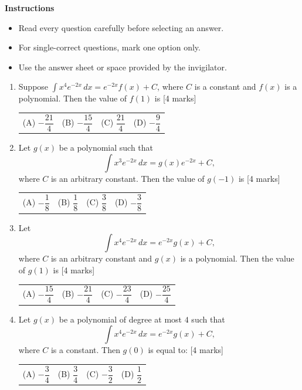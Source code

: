 \documentclass[11pt,a4paper]{article}
\begin{document}
\textbf{Instructions}
\begin{itemize}[topsep=2pt]
\item Read every question carefully before selecting an answer.
\item For single-correct questions, mark one option only.
\item Use the answer sheet or space provided by the invigilator.
\end{itemize}
\begin{enumerate}[resume]
\item Suppose \(\displaystyle \int x^{4}e^{-2x}\,dx=e^{-2x}f(x)+C\), where \(C\) is a constant and \(f(x)\) is a polynomial. Then the value of \(f(1)\) is \hfill [4 marks]
{\renewcommand{\arraystretch}{1.8}
\begin{tabularx}{\linewidth}{X X X X}
(A) \quad \(-\dfrac{21}{4}\) & (B) \quad \(-\dfrac{15}{4}\) & (C) \quad \(\dfrac{21}{4}\) & (D) \quad \(-\dfrac{9}{4}\) \\[10pt]
\end{tabularx}}
\item Let $g(x)$ be a polynomial such that
\[
\int x^3e^{-2x}\,dx=g(x)e^{-2x}+C,
\]
where $C$ is an arbitrary constant. Then the value of $g(-1)$ is \hfill [4 marks]
{\renewcommand{\arraystretch}{1.8}
\begin{tabularx}{\linewidth}{X X X X}
(A) \quad $-\dfrac{1}{8}$ & (B) \quad $\dfrac{1}{8}$ & (C) \quad $\dfrac{3}{8}$ & (D) \quad $-\dfrac{3}{8}$ \\[10pt]
\end{tabularx}}
\item Let
\[
\int x^{4}e^{-2x}\,dx=e^{-2x}g(x)+C,
\]
where \(C\) is an arbitrary constant and \(g(x)\) is a polynomial. Then the value of \(g(1)\) is \hfill [4 marks]
{\renewcommand{\arraystretch}{1.8}
\begin{tabularx}{\linewidth}{X X X X}
(A) \quad \(-\dfrac{15}{4}\) & (B) \quad \(-\dfrac{21}{4}\) & (C) \quad \(-\dfrac{23}{4}\) & (D) \quad \(-\dfrac{25}{4}\) \\[10pt]
\end{tabularx}}
\item Let \(g(x)\) be a polynomial of degree at most \(4\) such that
\[
\int x^4e^{-2x}\,dx=e^{-2x}g(x)+C,
\]
where \(C\) is a constant. Then \(g(0)\) is equal to: \hfill [4 marks]
{\renewcommand{\arraystretch}{1.8}
\begin{tabularx}{\linewidth}{X X X X}
(A) \quad \(-\dfrac{3}{4}\) & (B) \quad \(\dfrac{3}{4}\) & (C) \quad \(-\dfrac{3}{2}\) & (D) \quad \(\dfrac{1}{2}\) \\[10pt]

\end{tabularx}}
\end{enumerate}
\end{document}
